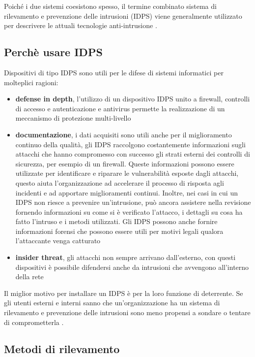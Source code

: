 \documentclass[../main.tex]{subfiles}
\begin{document}
Poiché i due sistemi coesistono spesso, il termine combinato sistema di rilevamento e prevenzione delle intrusioni (IDPS) viene generalmente utilizzato per descrivere le attuali tecnologie anti-intrusione \cite{IPS}.


\subsection{Perchè usare IDPS}
Dispositivi di tipo IDPS sono utili per le difese di sistemi informatici per molteplici ragioni:
\begin{itemize}
				\item \textbf{defense in depth}, l'utilizzo di un dispositivo IDPS unito a firewall, controlli di accesso e autenticazione e antivirus permette la realizzazione di un meccanismo di protezione multi-livello
				\item \textbf{documentazione}, i dati acquisiti sono utili anche per il miglioramento continuo della qualità, gli IDPS raccolgono costantemente informazioni sugli attacchi che hanno compromesso con successo gli strati esterni dei controlli di sicurezza, per esempio di un firewall. Queste informazioni possono essere utilizzate per identificare e riparare le vulnerabilità esposte dagli attacchi, questo aiuta l'organizzazione ad accelerare il processo di risposta agli incidenti e ad apportare miglioramenti continui.
								Inoltre, nei casi in cui un IDPS non riesce a prevenire un'intrusione, può ancora assistere nella revisione fornendo informazioni su come si è verificato l'attacco, i dettagli su cosa ha fatto l'intruso e i metodi utilizzati. Gli IDPS possono anche fornire informazioni forensi che possono essere utili per motivi legali qualora l'attaccante venga catturato \cite{IPS}
				\item \textbf{insider threat}, gli attacchi non sempre arrivano dall'esterno, con questi dispositivi è possibile difendersi anche da intrusioni che avvengono all'interno della rete
\end{itemize}

Il miglior motivo per installare un IDPS è per la loro funzione di deterrente. Se gli utenti esterni e interni sanno che un'organizzazione ha un sistema di rilevamento e prevenzione delle intrusioni sono meno propensi a sondare o tentare di comprometterla \cite{IPS}.

\subsection{Metodi di rilevamento}
\end{document}
